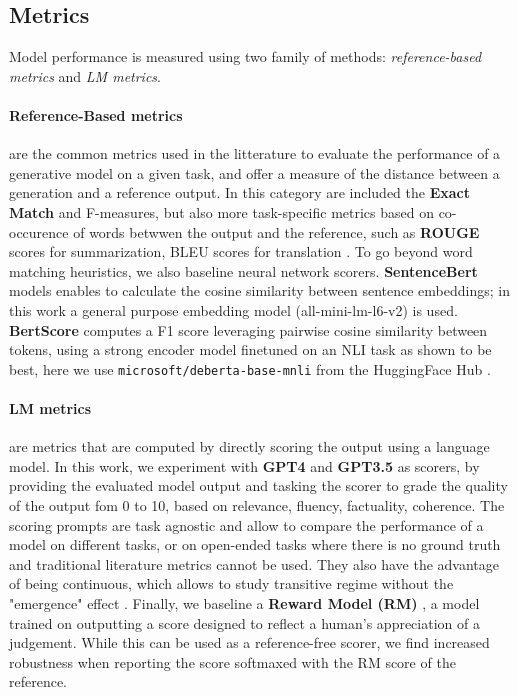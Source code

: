 \subsection{Metrics}
\label{sec:metrics}

Model performance is measured using two family of methods: \textit{reference-based metrics} and \textit{LM metrics}.

\paragraph{Reference-Based metrics} are the common metrics used in the litterature to evaluate the performance of a generative model on a given task, and offer a measure of the distance between a generation and a reference output. In this category are included the \textbf{Exact Match} and F-measures, but also more task-specific metrics based on co-occurence of words betwwen the output and the reference, such as \textbf{ROUGE} scores  for summarization, BLEU scores for translation . To go beyond word matching heuristics, we also baseline neural network scorers. \textbf{SentenceBert} models  enables to calculate the cosine similarity between sentence embeddings; in this work a general purpose embedding model (all-mini-lm-l6-v2) is used. \textbf{BertScore} computes a F1 score leveraging pairwise cosine similarity between tokens, using a strong encoder model finetuned on an NLI task as shown to be best, here we use \texttt{microsoft/deberta-base-mnli} from the HuggingFace Hub .


\paragraph{LM metrics} are metrics that are computed by directly scoring the output using a language model. In this work, we experiment with \textbf{GPT4} and \textbf{GPT3.5} as scorers, by providing the evaluated model output and tasking the scorer to grade the quality of the output fom 0 to 10, based on relevance, fluency, factuality, coherence. The scoring prompts are task agnostic and allow to compare the performance of a model on different tasks, or on open-ended tasks where there is no ground truth and traditional literature metrics cannot be used. They also have the advantage of being continuous, which allows to study transitive regime without the "emergence" effect . Finally, we baseline a \textbf{Reward Model (RM)} , a model trained on outputting a score designed to reflect a human's appreciation of a judgement. While this can be used as a reference-free scorer, we find increased robustness when reporting the score softmaxed with the RM score of the reference.

